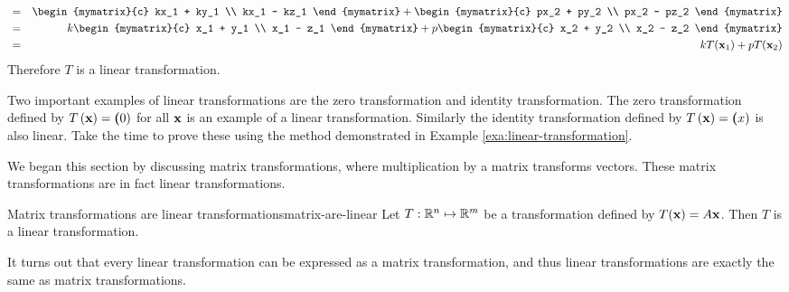 \begin{solution}
\begin{eqnarray*}
&=& \begin{mymatrix}{c} kx_1 + ky_1 \\ kx_1 - kz_1 \end{mymatrix} + \begin{mymatrix}{c} px_2 + py_2 \\  px_2 - pz_2 \end{mymatrix} \\
&=& k \begin{mymatrix}{c} x_1 + y_1 \\ x_1 - z_1 \end{mymatrix} + p \begin{mymatrix}{c} x_2 + y_2 \\  x_2 - z_2 \end{mymatrix} \\
&=& k T(\vect{x}_1) + p T(\vect{x}_2) 
\end{eqnarray*}
Therefore $T$ is a linear transformation. 
\end{solution}

Two important examples of linear transformations are the zero transformation and identity transformation. The zero transformation defined by $T\left(\mbox{\bf x} \right) = \mbox{\bf (}0)$ for all $\mbox{\bf x}$ is an example of a linear transformation. Similarly the identity transformation defined by $T\left(\mbox{\bf x} \right) = \mbox{\bf (}x)$ is also linear. Take the time to prove these using the method demonstrated in Example \ref{exa:linear-transformation}.

We began this section by discussing matrix transformations, where multiplication by a matrix transforms vectors. These matrix transformations are in fact linear transformations. 

\begin{theorem}{Matrix transformations are linear transformations}{matrix-are-linear}
Let $T:\mathbb{R}^{n}\mapsto \mathbb{R}^{m}$ be a transformation defined by $T(\mbox{\bf x}) = A\mbox{\bf x}$. Then $T$ is a linear transformation. 
\end{theorem}

It turns out that every linear transformation can be expressed as a matrix transformation, and thus linear transformations are exactly the same as matrix transformations. 
